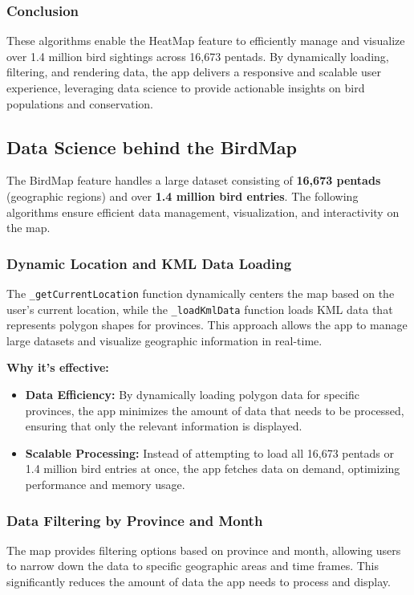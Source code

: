 \documentclass{article}
\begin{document}
\subsubsection{Conclusion}
These algorithms enable the HeatMap feature to efficiently manage and visualize over 1.4 million bird sightings across 16,673 pentads. By dynamically loading, filtering, and rendering data, the app delivers a responsive and scalable user experience, leveraging data science to provide actionable insights on bird populations and conservation.

\subsection{Data Science behind the BirdMap}

The BirdMap feature handles a large dataset consisting of \textbf{16,673 pentads} (geographic regions) and over \textbf{1.4 million bird entries}. The following algorithms ensure efficient data management, visualization, and interactivity on the map.

\subsubsection{Dynamic Location and KML Data Loading}
The \texttt{\_getCurrentLocation} function dynamically centers the map based on the user's current location, while the \texttt{\_loadKmlData} function loads KML data that represents polygon shapes for provinces. This approach allows the app to manage large datasets and visualize geographic information in real-time.

\textbf{Why it's effective:}
\begin{itemize}
    \item \textbf{Data Efficiency:} By dynamically loading polygon data for specific provinces, the app minimizes the amount of data that needs to be processed, ensuring that only the relevant information is displayed.
    \item \textbf{Scalable Processing:} Instead of attempting to load all 16,673 pentads or 1.4 million bird entries at once, the app fetches data on demand, optimizing performance and memory usage.
\end{itemize}

\subsubsection{Data Filtering by Province and Month}
The map provides filtering options based on province and month, allowing users to narrow down the data to specific geographic areas and time frames. This significantly reduces the amount of data the app needs to process and display.
\end{document}
